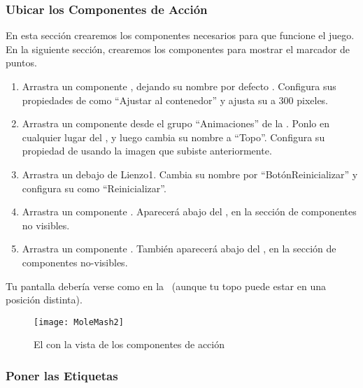 \subsubsection*{Ubicar los Componentes de Acción}

En esta sección crearemos los componentes necesarios para que funcione
el juego. En la siguiente sección, crearemos los componentes para
mostrar el marcador de puntos.

\begin{enumerate}

\item Arrastra un componente , dejando su nombre por
  defecto . Configura sus propiedades de
   como ``Ajustar al contenedor'' y ajusta su
   a 300 pixeles.

\item Arrastra un componente  desde el grupo
  ``Animaciones'' de la \palette. Ponlo en cualquier lugar del
  , y luego cambia su nombre a ``Topo''. Configura
  su propiedad de  usando la imagen
   que subiste anteriormente.

\item Arrastra un  debajo de Lienzo1. Cambia su
  nombre por ``BotónReinicializar'' y configura su 
  como ``Reinicializar''.

\item Arrastra un componente . Aparecerá abajo del
  \viewer, en la sección de componentes no visibles.

\item Arrastra un componente . También aparecerá
  abajo del \viewer, en la sección de componentes no-visibles.
\end{enumerate}

Tu pantalla debería verse como en la~ (aunque tu
topo puede estar en una posición distinta).

\begin{figure}[H]
\vspace{3em}
\centering
\texttt{[image: MoleMash2]}
\caption{El \designer con la vista de los componentes de acción}
\label{fig:MoleMash2}
\end{figure}


\subsubsection*{Poner las Etiquetas}

